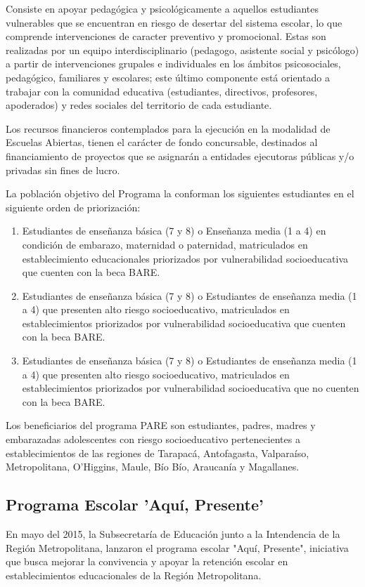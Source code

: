 Consiste en apoyar pedagógica y psicológicamente a aquellos estudiantes vulnerables que se encuentran en riesgo de desertar del sistema escolar, lo que comprende intervenciones de caracter preventivo y promocional. Estas son realizadas por un equipo interdisciplinario (pedagogo, asistente social y psicólogo) a partir de intervenciones grupales e individuales en los ámbitos psicosociales, pedagógico, familiares y escolares; este último componente está orientado a trabajar con la comunidad educativa (estudiantes, directivos, profesores, apoderados) y redes sociales del territorio de cada estudiante.

Los recursos financieros contemplados para la ejecución en la modalidad de Escuelas Abiertas, tienen el carácter de fondo concursable, destinados al financiamiento de proyectos que se asignarán a entidades ejecutoras públicas y/o privadas sin fines de lucro.

La población objetivo del Programa la conforman los siguientes estudiantes en el siguiente orden de priorización:
\begin{enumerate}
\item Estudiantes de enseñanza básica (7 y 8) o Enseñanza media (1 a 4) en condición de embarazo, maternidad o paternidad, matriculados en establecimiento educacionales priorizados por vulnerabilidad socioeducativa que cuenten con la beca BARE.
\item Estudiantes de enseñanza básica (7 y 8) o Estudiantes de enseñanza media (1 a 4) que presenten alto riesgo socioeducativo, matriculados en establecimientos priorizados por vulnerabilidad socioeducativa que cuenten con la beca BARE.
\item Estudiantes de enseñanza básica (7 y 8) o Estudiantes de enseñanza media (1 a 4) que presenten alto riesgo socioeducativo, matriculados en establecimientos priorizados por vulnerabilidad socioeducativa que no cuenten con la beca BARE.
\end{enumerate}

Los beneficiarios del programa PARE son estudiantes, padres, madres y embarazadas adolescentes con riesgo socioeducativo pertenecientes a establecimientos de las regiones de Tarapacá, Antofagasta, Valparaíso, Metropolitana, O'Higgins, Maule, Bío Bío, Araucanía y Magallanes. \cite{pare}

\subsection{Programa Escolar 'Aquí, Presente'}
En mayo del 2015, la Subsecretaría de Educación junto a la Intendencia de la Región Metropolitana, lanzaron el programa escolar "Aquí, Presente", iniciativa que busca mejorar la convivencia y apoyar la retención escolar en establecimientos educacionales de la Región Metropolitana.

